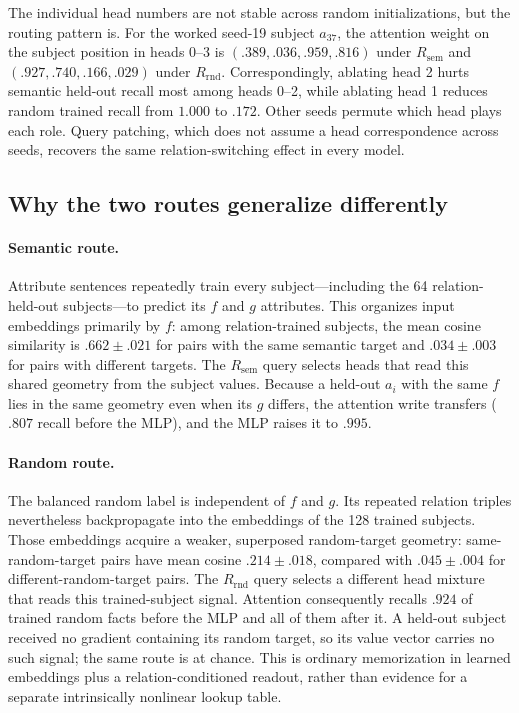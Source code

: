 \documentclass[11pt]{article}
\newcommand{\Rsem}{R_{\mathrm{sem}}}
\newcommand{\Rrnd}{R_{\mathrm{rnd}}}
\begin{document}
The individual head numbers are not stable across random initializations, but the routing pattern is. For the worked seed-19 subject $a_{37}$, the attention weight on the subject position in heads 0--3 is $(.389,.036,.959,.816)$ under $\Rsem$ and $(.927,.740,.166,.029)$ under $\Rrnd$. Correspondingly, ablating head 2 hurts semantic held-out recall most among heads 0--2, while ablating head 1 reduces random trained recall from $1.000$ to $.172$. Other seeds permute which head plays each role. Query patching, which does not assume a head correspondence across seeds, recovers the same relation-switching effect in every model.

\subsection{Why the two routes generalize differently}

\paragraph{Semantic route.}
Attribute sentences repeatedly train every subject---including the 64 relation-held-out subjects---to predict its $f$ and $g$ attributes. This organizes input embeddings primarily by $f$: among relation-trained subjects, the mean cosine similarity is $.662 \pm .021$ for pairs with the same semantic target and $.034 \pm .003$ for pairs with different targets. The $\Rsem$ query selects heads that read this shared geometry from the subject values. Because a held-out $a_i$ with the same $f$ lies in the same geometry even when its $g$ differs, the attention write transfers ($.807$ recall before the MLP), and the MLP raises it to $.995$.

\paragraph{Random route.}
The balanced random label is independent of $f$ and $g$. Its repeated relation triples nevertheless backpropagate into the embeddings of the 128 trained subjects. Those embeddings acquire a weaker, superposed random-target geometry: same-random-target pairs have mean cosine $.214 \pm .018$, compared with $.045 \pm .004$ for different-random-target pairs. The $\Rrnd$ query selects a different head mixture that reads this trained-subject signal. Attention consequently recalls $.924$ of trained random facts before the MLP and all of them after it. A held-out subject received no gradient containing its random target, so its value vector carries no such signal; the same route is at chance. This is ordinary memorization in learned embeddings plus a relation-conditioned readout, rather than evidence for a separate intrinsically nonlinear lookup table.
\end{document}
